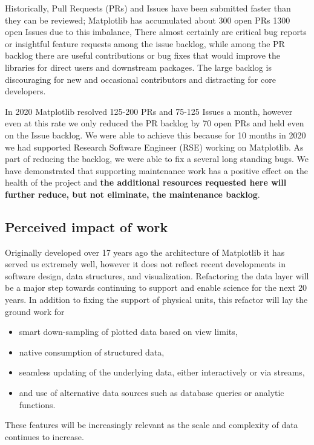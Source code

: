 \documentclass[12pt]{article}
\numberwithin{page}{section}
\begin{document}



Historically, Pull Requests (PRs) and Issues have been submitted
faster than they can be reviewed; Matplotlib has accumulated about 300
open PRs 1300 open Issues due to this imbalance, There almost
certainly are critical bug reports or insightful feature requests among
the issue backlog, while among the PR backlog there are useful contributions
or bug fixes that would improve the libraries for direct users and
downstream packages.  The large backlog is discouraging for new and
occasional contributors and distracting for core developers.

In 2020 Matplotlib resolved 125-200 PRs and 75-125 Issues a month,
however even at this rate we only reduced the PR backlog by 70 open
PRs and held even on the Issue backlog.  We were able to achieve this
because for 10 months in 2020 we had supported Research Software
Engineer (RSE) working on Matplotlib.  As part of reducing the
backlog, we were able to fix a several long standing bugs.  We have
demonstrated that supporting maintenance work has a positive effect on
the health of the project and \textbf{the additional resources
  requested here will further reduce, but not eliminate, the
  maintenance backlog}.


\subsection{Perceived impact of work}
\label{sec:piw}

Originally developed over 17 years ago the architecture of Matplotlib
it has served us extremely well, however it does not reflect recent
developments in software design, data structures, and visualization.
Refactoring the data layer will be a major step towards continuing to
support and enable science for the next 20 years.  In addition to fixing
the support of physical units, this refactor will lay the ground work for
\begin{itemize}[noitemsep]
  \item smart down-sampling of plotted data based on view limits,
  \item native consumption of structured data,
  \item seamless updating of the underlying data, either interactively
    or via streams,
  \item and use of alternative data sources such as database queries
    or analytic functions.
\end{itemize}
These features will be increasingly relevant as the scale and complexity
of data continues to increase.
\end{document}
